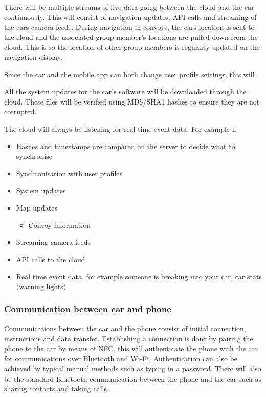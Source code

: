 \documentclass{article}
\begin{document}
There will be multiple streams of live data going between the cloud and the car continuously. This will consist of navigation updates, API calls and streaming of the cars camera feeds.
During navigation in convoys, the cars location is sent to the cloud and the associated group member's locations are pulled down from the cloud. This is so the location of other group members is regularly updated on the navigation display.

Since the car and the mobile app can both change user profile settings, this will 

All the system updates for the car's software will be downloaded through the cloud. These files will be verified using MD5/SHA1 hashes to ensure they are not corrupted.

The cloud will always be listening for real time event data. For example if 

\begin{itemize}
  \item Hashes and timestamps are compared on the server to decide what to synchronise
  \item Synchronisation with user profiles
  \item System updates
  \item Map updates
  \begin{itemize}
    \item Convoy information
  \end{itemize}
  \item Streaming camera feeds
  \item API calls to the cloud
  \item Real time event data, for example someone is breaking into your car, car stats (warning lights)
\end{itemize}
\subsubsection{Communication between car and phone}
Communications between the car and the phone consist of initial connection, instructions and data transfer. Establishing a connection is done by pairing the phone to the car by means of NFC, this will authenticate the phone with the car for communications over Bluetooth and Wi-Fi. Authentication can also be achieved by typical manual methods such as typing in a password. There will also be the standard Bluetooth communication between the phone and the car such as sharing contacts and taking calls.
\end{document}
